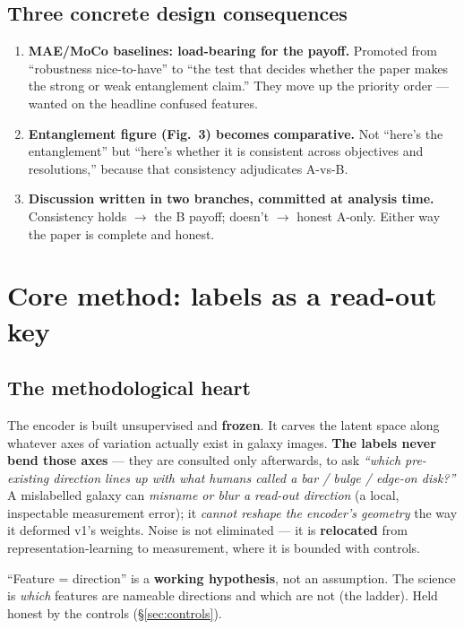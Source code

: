\documentclass[11pt,a4paper]{article}
\begin{document}
\subsection{Three concrete design consequences}


\begin{enumerate}[leftmargin=1.5em,itemsep=2pt]
\item \textbf{MAE/MoCo baselines: load-bearing for the payoff.} Promoted from
``robustness nice-to-have'' to ``the test that decides whether the paper makes the strong or
weak entanglement claim.'' They move up the priority order --- wanted on the headline confused
features.
\item \textbf{Entanglement figure (Fig.~3) becomes comparative.} Not ``here's the
entanglement'' but ``here's whether it is consistent across objectives and resolutions,''
because that consistency adjudicates A-vs-B.
\item \textbf{Discussion written in two branches, committed at analysis time.} Consistency
holds $\rightarrow$ the B payoff; doesn't $\rightarrow$ honest A-only. Either way the paper is
complete and honest.
\end{enumerate}

\section{Core method: labels as a read-out key}\label{sec:method}

\subsection{The methodological heart}


The encoder is built unsupervised and \textbf{frozen}. It carves the latent space along
whatever axes of variation actually exist in galaxy images. \textbf{The labels never bend those
axes} --- they are consulted only afterwards, to ask \emph{``which pre-existing direction lines
up with what humans called a bar / bulge / edge-on disk?''} A mislabelled galaxy can
\emph{misname or blur a read-out direction} (a local, inspectable measurement error); it
\emph{cannot reshape the encoder's geometry} the way it deformed v1's weights. Noise is not
eliminated --- it is \textbf{relocated} from representation-learning to measurement, where it
is bounded with controls.

\begin{openbox}
``Feature = direction'' is a \textbf{working hypothesis}, not an assumption. The science is
\emph{which} features are nameable directions and which are not (the ladder). Held honest by
the controls (\S\ref{sec:controls}).
\end{openbox}
\end{document}
